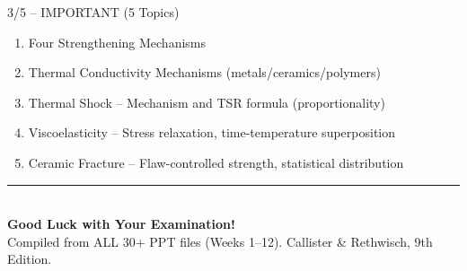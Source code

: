 \documentclass[11pt,a4paper]{article}
\begin{document}
\begin{keybox}{3/5 -- IMPORTANT (5 Topics)}
\begin{enumerate}[leftmargin=*,start=16,nosep]
    \item Four Strengthening Mechanisms
    \item Thermal Conductivity Mechanisms (metals/ceramics/polymers)
    \item Thermal Shock -- Mechanism and TSR formula (proportionality)
    \item Viscoelasticity -- Stress relaxation, time-temperature superposition
    \item Ceramic Fracture -- Flaw-controlled strength, statistical distribution
\end{enumerate}
\end{keybox}

\vspace{12pt}

\vfill
\begin{center}
  \rule{0.6\textwidth}{0.4pt}\\[1em]
  {\Large\bfseries\color{PrimaryDark} Good Luck with Your Examination!}\\[0.5em]
  {\footnotesize\color{DarkGray} Compiled from ALL 30+ PPT files (Weeks 1--12). Callister \& Rethwisch, 9th Edition.}
\end{center}
\end{document}
